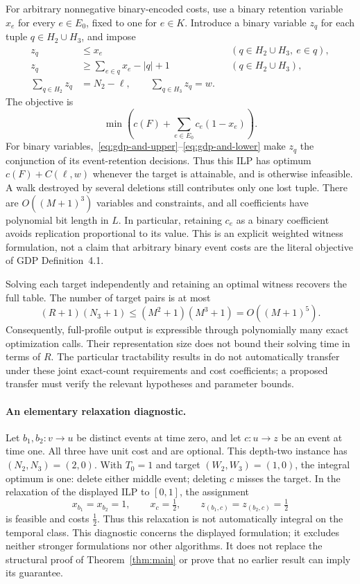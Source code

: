 For arbitrary nonnegative binary-encoded costs, use a binary retention
variable $x_e$ for every $e\in E_0$, fixed to one for $e\in K$. Introduce a
binary variable $z_q$ for each tuple $q\in H_2\cup H_3$, and impose
\begin{align}
 z_q&\le x_e &&(q\in H_2\cup H_3,\ e\in q),\label{eq:gdp-and-upper}\\
 z_q&\ge \sum_{e\in q}x_e-|q|+1
              &&(q\in H_2\cup H_3),\label{eq:gdp-and-lower}\\
 \sum_{q\in H_2}z_q&=N_2-\ell,\qquad
 \sum_{q\in H_3}z_q=w.\label{eq:gdp-exact}
\end{align}
The objective is
\begin{equation}
 \min\left(c(F)+\sum_{e\in E_0}c_e(1-x_e)\right).
 \label{eq:gdp-cost}
\end{equation}
For binary variables,~\eqref{eq:gdp-and-upper}--\eqref{eq:gdp-and-lower}
make $z_q$ the conjunction of its event-retention decisions. Thus this ILP
has optimum $c(F)+C(\ell,w)$ whenever the target is attainable, and is
otherwise infeasible. A walk destroyed by several deletions still contributes
only one lost tuple. There are $O((M+1)^3)$ variables and constraints, and
all coefficients have polynomial bit length in $L$. In particular, retaining
$c_e$ as a binary coefficient avoids replication proportional to its value.
This is an explicit weighted witness formulation, not a claim that arbitrary
binary event costs are the literal objective of GDP Definition~4.1.

Solving each target independently and retaining an optimal witness recovers
the full table. The number of target pairs is at most
\[
 (R+1)(N_3+1)\le (M^2+1)(M^3+1)=O((M+1)^5).
\]
Consequently, full-profile output is expressible through polynomially many
exact optimization calls. Their representation size does not bound their
solving time in terms of $R$. The particular tractability results in
\citet[Section 6]{makhija2025gdp} do not automatically transfer under these
joint exact-count requirements and cost coefficients; a proposed transfer
must verify the relevant hypotheses and parameter bounds.

\paragraph{An elementary relaxation diagnostic.}
Let $b_1,b_2:v\to u$ be distinct events at time zero, and let $c:u\to z$ be
an event at time one. All three have unit cost and are optional. This
depth-two instance has $(N_2,N_3)=(2,0)$. With $T_0=1$ and target
$(W_2,W_3)=(1,0)$, the integral optimum is one: delete either middle event;
deleting $c$ misses the target. In the relaxation of the displayed ILP to
$[0,1]$, the assignment
\[
 x_{b_1}=x_{b_2}=1,\qquad x_c=\tfrac12,\qquad
 z_{(b_1,c)}=z_{(b_2,c)}=\tfrac12
\]
is feasible and costs $\tfrac12$. Thus this relaxation is not automatically
integral on the temporal class. This diagnostic concerns the displayed
formulation; it excludes neither stronger formulations nor other algorithms.
It does not replace the structural proof of Theorem~\ref{thm:main} or prove
that no earlier result can imply its guarantee.
